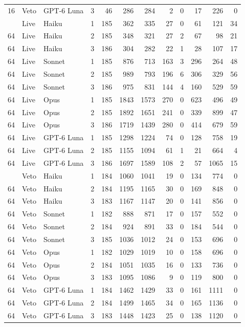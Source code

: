 \begin{tabular}{llllrrrrrrrr}
16 & Veto & GPT-6 Luna & 3 & 46 & 286 & 284 & 2 & 0 & 17 & 226 & 0 \\
\addlinespace
64 & Live & Haiku & 1 & 185 & 362 & 335 & 27 & 0 & 61 & 121 & 34 \\
64 & Live & Haiku & 2 & 185 & 348 & 321 & 27 & 2 & 67 & 98 & 21 \\
64 & Live & Haiku & 3 & 186 & 304 & 282 & 22 & 1 & 28 & 107 & 17 \\
64 & Live & Sonnet & 1 & 185 & 876 & 713 & 163 & 3 & 296 & 264 & 48 \\
64 & Live & Sonnet & 2 & 185 & 989 & 793 & 196 & 6 & 306 & 329 & 56 \\
64 & Live & Sonnet & 3 & 186 & 975 & 831 & 144 & 4 & 160 & 529 & 59 \\
64 & Live & Opus & 1 & 185 & 1843 & 1573 & 270 & 0 & 623 & 496 & 49 \\
64 & Live & Opus & 2 & 185 & 1892 & 1651 & 241 & 0 & 339 & 899 & 47 \\
64 & Live & Opus & 3 & 186 & 1719 & 1439 & 280 & 0 & 414 & 679 & 59 \\
64 & Live & GPT-6 Luna & 1 & 185 & 1298 & 1224 & 74 & 0 & 128 & 758 & 19 \\
64 & Live & GPT-6 Luna & 2 & 185 & 1155 & 1094 & 61 & 1 & 21 & 664 & 4 \\
64 & Live & GPT-6 Luna & 3 & 186 & 1697 & 1589 & 108 & 2 & 57 & 1065 & 15 \\
\addlinespace
64 & Veto & Haiku & 1 & 184 & 1060 & 1041 & 19 & 0 & 134 & 774 & 0 \\
64 & Veto & Haiku & 2 & 184 & 1195 & 1165 & 30 & 0 & 169 & 848 & 0 \\
64 & Veto & Haiku & 3 & 183 & 1167 & 1147 & 20 & 0 & 141 & 856 & 0 \\
64 & Veto & Sonnet & 1 & 182 & 888 & 871 & 17 & 0 & 157 & 552 & 0 \\
64 & Veto & Sonnet & 2 & 184 & 924 & 891 & 33 & 0 & 184 & 544 & 0 \\
64 & Veto & Sonnet & 3 & 185 & 1036 & 1012 & 24 & 0 & 153 & 696 & 0 \\
64 & Veto & Opus & 1 & 182 & 1029 & 1019 & 10 & 0 & 158 & 696 & 0 \\
64 & Veto & Opus & 2 & 184 & 1051 & 1035 & 16 & 0 & 133 & 736 & 0 \\
64 & Veto & Opus & 3 & 183 & 1095 & 1086 & 9 & 0 & 119 & 800 & 0 \\
64 & Veto & GPT-6 Luna & 1 & 184 & 1462 & 1429 & 33 & 0 & 161 & 1111 & 0 \\
64 & Veto & GPT-6 Luna & 2 & 184 & 1499 & 1465 & 34 & 0 & 165 & 1136 & 0 \\
64 & Veto & GPT-6 Luna & 3 & 183 & 1448 & 1423 & 25 & 0 & 138 & 1120 & 0 \\
\bottomrule
\end{tabular}
